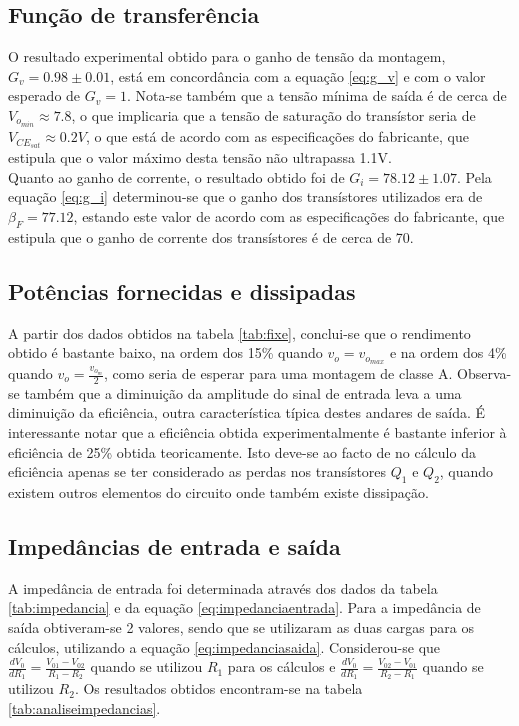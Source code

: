 \documentclass[%
  reprint,
  nofootinbib,
  amsmath,amssymb,
  aps,
  10pt,
  a4paper
]{revtex4-1}
\begin{document}
\subsection{Função de transferência}
O resultado experimental obtido para o ganho de tensão da montagem, $G_v=0.98\pm0.01$, está em concordância com a equação \ref{eq:g_v} e com o valor esperado de $G_v=1$. Nota-se também que a tensão mínima de saída é de cerca de $V_{o_{min}}\approx7.8$, o que implicaria que a tensão de saturação do transístor seria de $V_{{CE}_{sat}}\approx0.2V$, o que está de acordo com as especificações do fabricante, que estipula que o valor máximo desta tensão não ultrapassa 1.1V.\\
Quanto ao ganho de corrente, o resultado obtido foi de $G_i=78.12\pm1.07$. Pela equação \ref{eq:g_i} determinou-se que o ganho dos transístores utilizados era de $\beta_F=77.12$, estando este valor de acordo com as especificações do fabricante, que estipula que o ganho de corrente dos transístores é de cerca de 70.

\subsection{Potências fornecidas e dissipadas}
A partir dos dados obtidos na tabela \ref{tab:fixe}, conclui-se que o rendimento obtido é bastante baixo, na ordem dos 15\% quando $v_o=v_{o_{max}}$ e na ordem dos 4\% quando $v_o=\frac{v_{o_m}}{2}$, como seria de esperar para uma montagem de classe A. Observa-se também que a diminuição da amplitude do sinal de entrada leva a uma diminuição da eficiência, outra característica típica destes andares de saída.  É interessante notar que a eficiência obtida  experimentalmente é bastante inferior à eficiência de 25\% obtida teoricamente. Isto deve-se ao facto de no cálculo da eficiência apenas se ter considerado as perdas nos transístores $Q_1$ e $Q_2$, quando existem outros elementos do circuito onde também existe dissipação.

\subsection{Impedâncias de entrada e saída}
A impedância de entrada foi determinada através dos dados da tabela \ref{tab:impedancia} e da equação \ref{eq:impedanciaentrada}. Para a impedância de saída obtiveram-se 2 valores, sendo que se utilizaram as duas cargas para os cálculos, utilizando a equação \ref{eq:impedanciasaida}. Considerou-se que $\frac{dV_0}{dR_1}=\frac{V_{01}-V_{02}}{R_1-R_2}$ quando se utilizou $R_1$ para os cálculos e $\frac{dV_0}{dR_1}=\frac{V_{02}-V_{01}}{R_2-R_1}$ quando se utilizou $R_2$. Os resultados obtidos encontram-se na tabela \ref{tab:analiseimpedancias}.
\end{document}
